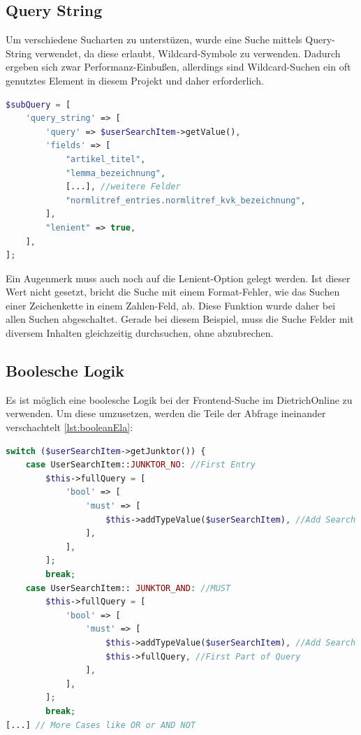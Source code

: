 \subsection{Query String}
Um verschiedene Sucharten zu unterstüzen, wurde eine Suche mittels Query-String verwendet, da diese erlaubt, Wildcard-Symbole zu verwenden. Dadurch ergeben sich zwar Performanz-Einbußen, allerdings sind Wildcard-Suchen ein oft genutztes Element in diesem Projekt und daher erforderlich.

\begin{lstlisting}[language=PHP, frame=single, label={lst:aufbauQueryString}, caption=Beispiel eines Query-Strings,captionpos=b] 
$subQuery = [
    'query_string' => [
        'query' => $userSearchItem->getValue(),
        'fields' => [
            "artikel_titel",
            "lemma_bezeichnung",
            [...], //weitere Felder
            "normlitref_entries.normlitref_kvk_bezeichnung",
        ],
        "lenient" => true,
    ],
];
\end{lstlisting}

Ein Augenmerk muss auch noch auf die Lenient-Option gelegt werden. Ist dieser Wert nicht gesetzt, bricht die Suche mit einem Format-Fehler, wie das Suchen einer Zeichenkette in einem Zahlen-Feld, ab. Diese Funktion wurde daher bei allen Suchen abgeschaltet. Gerade bei diesem Beispiel, muss die Suche Felder mit diversem Inhalten gleichzeitig durchsuchen, ohne abzubrechen. \cite{ElasticsearchB.V..13.2.2020}

\subsection{Boolesche Logik}

Es ist möglich eine boolesche Logik bei der Frontend-Suche im DietrichOnline zu verwenden. Um diese umzusetzen, werden die Teile der Abfrage ineinander verschachtelt \ref{lst:booleanEla}:

\begin{lstlisting}[language=PHP, frame=single, label={lst:booleanEla}, caption=Auschnitt aus der boolischen Logik für das DietrichOnline-Projekt,captionpos=b] 
switch ($userSearchItem->getJunktor()) {
    case UserSearchItem::JUNKTOR_NO: //First Entry
        $this->fullQuery = [
            'bool' => [
                'must' => [
                    $this->addTypeValue($userSearchItem), //Add Search
                ],
            ],
        ];
        break;
    case UserSearchItem:: JUNKTOR_AND: //MUST
        $this->fullQuery = [
            'bool' => [
                'must' => [
                    $this->addTypeValue($userSearchItem), //Add Search
                    $this->fullQuery, //First Part of Query
                ],
            ],
        ];
        break;
[...] // More Cases like OR or AND NOT
\end{lstlisting}

